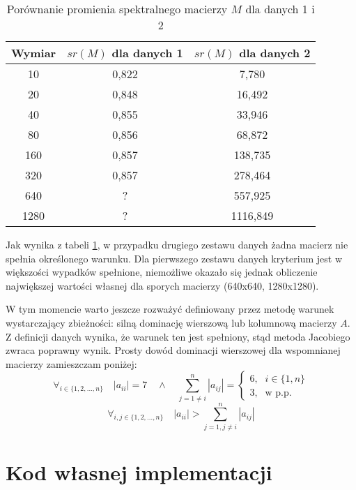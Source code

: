 \documentclass[12pt]{article}
\begin{document}
\begin{table}[!htbp]
\centering
\begin{tabular}{|c|c|c|} 
    \hline
    \textbf{Wymiar} & \textbf{\(sr(M)\) dla danych 1} & \textbf{\(sr(M)\) dla danych 2} \\
    \hline\hline
    10   & 0,822 & 7,780 \\ \hline
    20   & 0,848 & 16,492 \\ \hline
    40   & 0,855 & 33,946 \\ \hline
    80   & 0,856 & 68,872 \\ \hline
    160  & 0,857 & 138,735 \\ \hline
    320  & 0,857 & 278,464 \\ \hline
    640  & ?     & 557,925 \\ \hline
    1280 & ?     & 1116,849 \\ \hline
\end{tabular}
\caption{Porównanie promienia spektralnego macierzy \(M\) dla danych 1 i 2}
\label{table:sr}
\end{table}
\FloatBarrier

Jak wynika z tabeli \ref{table:sr}, w przypadku drugiego zestawu danych żadna macierz nie spełnia określonego warunku. Dla pierwszego zestawu danych kryterium jest w większości wypadków spełnione, niemożliwe okazało się jednak obliczenie największej wartości własnej dla sporych macierzy (640x640, 1280x1280).

W tym momencie warto jeszcze rozważyć definiowany przez metodę warunek wystarczający zbieżności: silną dominację wierszową lub kolumnową macierzy \(A\). Z definicji danych wynika, że warunek ten jest spełniony, stąd metoda Jacobiego zwraca poprawny wynik. Prosty dowód dominacji wierszowej dla wspomnianej macierzy zamieszczam poniżej:
\[
\forall_{i\in\{1, 2, ..., n\}} \quad
|a_{ii}| = 7
\quad \land \quad
\sum_{j=1\neq i}^{n} |a_{ij}| =
\begin{cases}
6\text{,} & i\in\{1, n\} \\
3\text{,} & \text{w p.p.}
\end{cases}
\]
\[
\forall_{i,j\in\{1, 2, ..., n\}} \quad
|a_{ii}| > \sum_{j=1,j\neq i}^{n} |a_{ij}|
\]

\clearpage
\section{Kod własnej implementacji}
\end{document}
